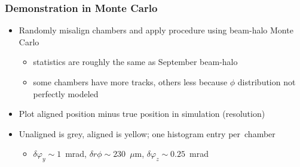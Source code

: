 \documentclass[compress]{beamer}
\begin{document}
\begin{frame}
\frametitle{Demonstration in Monte Carlo}

\begin{itemize}
\item Randomly misalign chambers and apply procedure using beam-halo Monte Carlo
\begin{itemize}
\item statistics are roughly the same as September beam-halo
\item some chambers have more tracks, others less because $\phi$ distribution not perfectly modeled
\end{itemize}
\item Plot aligned position minus true position in simulation (resolution)
\item Unaligned is grey, aligned is yellow; one histogram entry \mbox{per chamber\hspace{-1 cm}}
\begin{itemize}
\item $\delta \varphi_y \sim 1$~mrad, \hspace{0.2 cm} $\delta r\phi \sim 230$~$\mu$m, \hspace{0.2 cm} $\delta \varphi_z \sim 0.25$~mrad
\end{itemize}
\end{itemize}


\end{frame}
\end{document}
